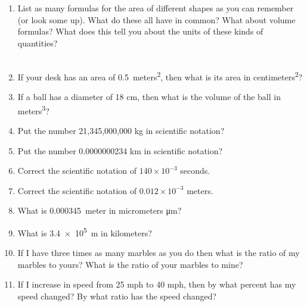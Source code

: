 \begin{enumerate}
\item
List as many formulas for the area of different shapes as you can remember (or look some up). What do these all have in common? What about volume formulas? What does this tell you about the units of these kinds of quantities?\\
\\


\item 
If your desk has an area of \SI{0.5}{meters^2}, then what is its area in \si{centimeters^2}?\\

\item 
If a ball has a diameter of 18 cm, then what is the volume of the ball in \si{meters^3}?\\

%

\item 
Put the number 21,345,000,000 kg in scientific notation?\\

\item 
Put the number 0.0000000234 km in scientific notation?\\

\item 
Correct the scientific notation of $140\times10^{-3}$ seconds.

\item 
Correct the scientific notation of $0.012\times10^{-3}$ meters.

\item 
What is \SI{0.000345}{meter} in micrometers \si{\um}?

\item 
What is \SI{3.4e5}{\meter} in kilometers?

\item 
If I have three times as many marbles as you do then what is the ratio of my marbles to yours? What is the ratio of your marbles to mine?


\item If I increase in speed from 25 mph to 40 mph, then by what percent has my speed changed? By what ratio has the speed changed?\\


\end{enumerate}
